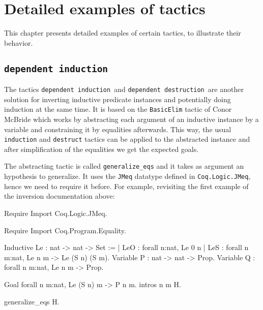 \chapter[Detailed examples of tactics]{Detailed examples of tactics\label{Tactics-examples}}

This chapter presents detailed examples of certain tactics, to
illustrate their behavior.

\section[\tt dependent induction]{\tt dependent induction\label{dependent-induction-example}}
\def\depind{{\tt dependent induction}~}
\def\depdestr{{\tt dependent destruction}~}

The tactics \depind and \depdestr are another solution for inverting
inductive predicate instances and potentially doing induction at the
same time. It is based on the \texttt{BasicElim} tactic of Conor McBride which
works by abstracting each argument of an inductive instance by a variable
and constraining it by equalities afterwards. This way, the usual 
{\tt induction} and {\tt destruct} tactics can be applied to the
abstracted instance and after simplification of the equalities we get
the expected goals.

The abstracting tactic is called {\tt generalize\_eqs} and it takes as
argument an hypothesis to generalize. It uses the {\tt JMeq} datatype
defined in {\tt Coq.Logic.JMeq}, hence we need to require it before.
For example, revisiting the first example of the inversion documentation above:

\begin{coq_example*}
Require Import Coq.Logic.JMeq.
\end{coq_example*}
\begin{coq_eval}
Require Import Coq.Program.Equality.
\end{coq_eval}

\begin{coq_eval}
Inductive Le : nat -> nat -> Set :=
  | LeO : forall n:nat, Le 0 n
  | LeS : forall n m:nat, Le n m -> Le (S n) (S m).
Variable P : nat -> nat -> Prop.
Variable Q : forall n m:nat, Le n m -> Prop.
\end{coq_eval}

\begin{coq_example*}
Goal forall n m:nat, Le (S n) m -> P n m.
intros n m H.
\end{coq_example*}
\begin{coq_example}
generalize_eqs H.
\end{coq_example}


